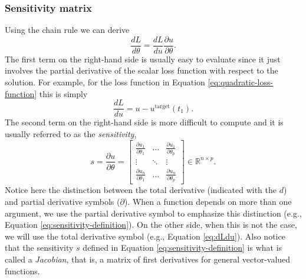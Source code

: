 \subsubsection{Sensitivity matrix}
Using the chain rule we can derive
\begin{equation} 
 \frac{dL}{d\theta} = \frac{dL}{du} \frac{\partial u}{\partial \theta}.
 \label{eq:dLdtheta_VJP}
\end{equation} 
The first term on the right-hand side is usually easy to evaluate since it just involves the partial derivative of the scalar loss function with respect to the solution.
For example, for the loss function in Equation \eqref{eq:quadratic-loss-function} this is simply
\begin{equation}
    \frac{dL}{du} = u - u^{\text{target}}(t_1).
    \label{eq:dLdu}
\end{equation}
The second term on the right-hand side is more difficult to compute and it is usually referred to as the \textit{sensitivity},
\begin{equation}
 s 
 = 
 \frac{\partial u}{\partial \theta} 
 =
 \begin{bmatrix}
   \frac{\partial u_1}{\partial \theta_1} & \dots & \frac{\partial u_1}{\partial \theta_p} \\
   \vdots & \ddots & \vdots \\
   \frac{\partial u_n}{\partial \theta_1} & \dots & \frac{\partial u_n}{\partial \theta_p}
 \end{bmatrix}
 \in \mathbb R^{n \times p}.
 \label{eq:sensitivity-definition}
\end{equation}
Notice here the distinction between the total derivative (indicated with the $d$) and partial derivative symbols ($\partial$). 
When a function depends on more than one argument, we use the partial derivative symbol to emphasize this distinction (e.g., Equation \eqref{eq:sensitivity-definition}). 
On the other side, when this is not the case, we will use the total derivative symbol (e.g., Equation \eqref{eq:dLdu}).
Also notice that the sensitivity $s$ defined in Equation \eqref{eq:sensitivity-definition} is what is called a \textit{Jacobian}, that is, a matrix of first derivatives for general vector-valued functions.

